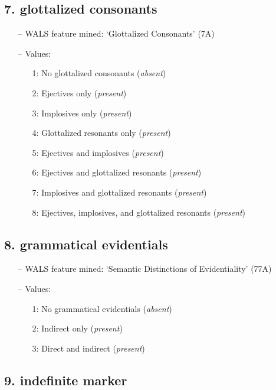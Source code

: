 \subsection*{7. glottalized consonants}

\begin{itemize}
\item[--] WALS feature mined: `Glottalized Consonants' (7A)
\item[--] Values:

\begin{enumerate}
\item[1:] No glottalized consonants (\emph{absent})
\item[2:] Ejectives only (\emph{present})
\item[3:] Implosives only (\emph{present})
\item[4:] Glottalized resonants only (\emph{present})
\item[5:] Ejectives and implosives (\emph{present})
\item[6:] Ejectives and glottalized resonants (\emph{present})
\item[7:] Implosives and glottalized resonants (\emph{present})
\item[8:] Ejectives, implosives, and glottalized resonants (\emph{present})
\end{enumerate}
\end{itemize}

\subsection*{8. grammatical evidentials}

\begin{itemize}
\item[--] WALS feature mined: `Semantic Distinctions of Evidentiality' (77A)
\item[--] Values:

\begin{enumerate}
\item[1:] No grammatical evidentials (\emph{absent})
\item[2:] Indirect only (\emph{present})
\item[3:] Direct and indirect (\emph{present})
\end{enumerate}
\end{itemize}

\subsection*{9. indefinite marker}

